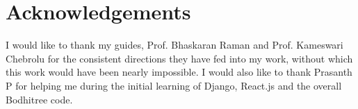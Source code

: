 \documentclass[12pt]{article}
\begin{document}

\newpage

\newpage

\newpage

\newpage

\newpage

\newpage

\newpage
%
%

\newpage
%
\section*{Acknowledgements}
I would like to thank my guides, Prof. Bhaskaran Raman and Prof. Kameswari Chebrolu for the consistent directions they have fed
into my work, without which this work would have been nearly impossible. I would also like to thank Prasanth P for helping me during the initial learning of Django, React.js and the overall Bodhitree code.
\newpage
%

%
%
\end{document}
